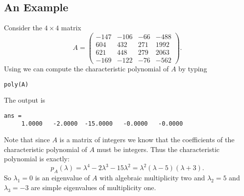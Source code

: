 \documentclass{ximera}
\begin{document}
\subsection*{An Example}

Consider the $4\times 4$ matrix
\begin{equation*} \label{e:Aexamp}
A=\left(\begin{array}{rrrr}      -147  &  -106      &   -66     &   -488\\
         604   &      432      &   271     &   1992\\
         621   &      448       &  279     &   2063\\
        -169    &    -122      &   -76     &   -562\end{array}\right).
\end{equation*}
Using \Matlab we can compute the characteristic polynomial of $A$
by typing
\begin{verbatim}
poly(A)
\end{verbatim}
The output is
\begin{verbatim}
ans =
     1.0000   -2.0000  -15.0000   -0.0000   -0.0000
\end{verbatim}
Note that since $A$ is a matrix of integers we know that the coefficients 
of the characteristic polynomial of $A$ must be integers.   Thus the 
characteristic polynomial is exactly:
\[
p_A(\lambda) = \lambda^4-2\lambda^3-15\lambda^2 =
	\lambda^2(\lambda-5)(\lambda+3).
\]
So $\lambda_1=0$ is an eigenvalue of $A$ with 
algebraic multiplicity two
and $\lambda_2=5$ and $\lambda_3=-3$ are simple eigenvalues of 
multiplicity one.
\end{document}
